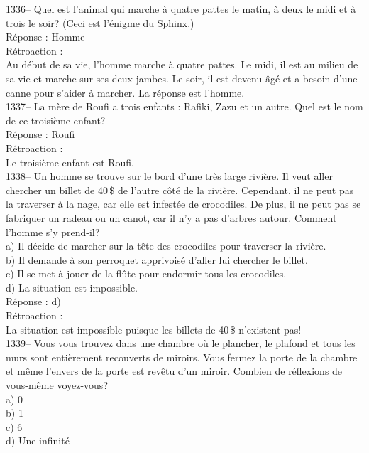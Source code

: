 ﻿\documentclass[letterpaper, 12pt]{article}
\begin{document}
1336-- Quel est l'animal qui marche \`a quatre pattes le matin, \`a deux le
midi et \`a trois le soir?  (Ceci est l'\'enigme du Sphinx.)\\

R\'eponse : Homme\\

R\'etroaction : \\
Au d\'ebut de sa vie, l'homme marche \`a quatre pattes.  Le midi, il est au
milieu de sa vie et marche sur ses deux jambes.  Le soir, il est devenu
\^ag\'e et a besoin d'une canne pour s'aider \`a marcher.  La r\'eponse est
l'homme.\\

1337-- La m\`ere de Roufi a trois enfants : Rafiki, Zazu et un autre.  Quel
est le nom de ce troisi\`eme enfant?\\

R\'eponse : Roufi\\

R\'etroaction : \\
Le troisi\`eme enfant est Roufi.\\

1338-- Un homme se trouve sur le bord d'une tr\`es large rivi\`ere.  Il veut
aller chercher un billet de 40\,\$ de l'autre c\^ot\'e de la rivi\`ere.
Cependant, il ne peut pas la traverser \`a la nage, car elle est infest\'ee
de crocodiles.  De plus, il ne peut pas se fabriquer un radeau ou un canot,
car il n'y a pas d'arbres autour.  Comment l'homme s'y prend-il?\\
a) Il d\'ecide de marcher sur la t\^ete des crocodiles  pour traverser la
rivi\`ere.\\
b) Il demande \`a son perroquet apprivois\'e d'aller lui chercher le
billet.\\
c) Il se met \`a jouer de la fl\^ute pour endormir tous les crocodiles. \\
d) La situation est impossible.\\

R\'eponse : d)\\

R\'etroaction : \\
La situation est impossible puisque les billets de 40\,\$ n'existent pas! \\

1339-- Vous vous trouvez dans une chambre o\`u le plancher, le plafond et
tous les murs sont enti\`erement recouverts de miroirs.  Vous fermez la
porte de la chambre et m\^eme l'envers de la porte est rev\^etu d'un miroir.
  Combien de r\'eflexions de vous-m\^eme voyez-vous?\\
a) 0\\
b) 1\\
c) 6\\
d) Une infinit\'e\\
\end{document}
